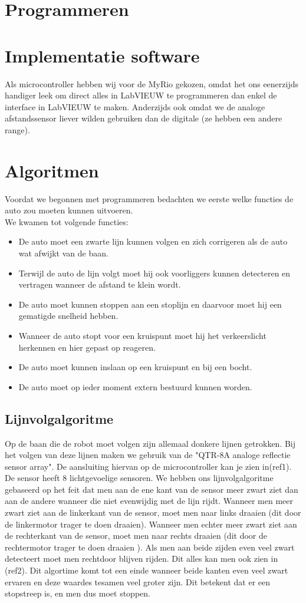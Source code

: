 \documentclass[12pt]{article}
\begin{document}
	

\section{Programmeren}
\section*{Implementatie software}
Als microcontroller hebben wij voor de MyRio gekozen, omdat het ons eenerzijds handiger leek om direct alles in LabVIEUW te programmeren dan enkel de interface in LabVIEUW te maken. Anderzijds ook omdat we de analoge afstandssensor liever wilden gebruiken dan de digitale (ze hebben een andere range).

\section*{Algoritmen}
Voordat we begonnen met programmeren bedachten we eerste welke functies de auto zou moeten kunnen uitvoeren.\\
We kwamen tot volgende functies:
	\begin{itemize}\item De auto moet een zwarte lijn kunnen volgen en zich corrigeren als de auto wat afwijkt van de baan.
	\item Terwijl de auto de lijn volgt moet hij ook voorliggers kunnen detecteren en vertragen wanneer de afstand te klein wordt.
	\item De auto moet kunnen stoppen aan een stoplijn en daarvoor moet hij een gematigde snelheid hebben.
	\item Wanneer de auto stopt voor een kruispunt moet hij het verkeerslicht herkennen en hier gepast op reageren.
	\item De auto moet kunnen inslaan op een kruispunt en bij een bocht.
	\item De auto moet op ieder moment extern bestuurd kunnen worden.\end{itemize}


\subsection{Lijnvolgalgoritme}
Op de baan die de robot moet volgen zijn allemaal donkere lijnen getrokken. Bij het volgen van deze lijnen maken we gebruik van de "QTR-8A analoge reflectie sensor array".
De aansluiting hiervan op de microcontroller kan je zien in(ref1). De sensor heeft 8 lichtgevoelige sensoren. We hebben ons lijnvolgalgoritme gebaseerd op het feit dat men aan de ene kant van de sensor meer zwart ziet dan aan de andere wanneer die niet evenwijdig met de lijn rijdt. Wanneer men meer zwart ziet aan de linkerkant van de sensor, moet men naar links draaien (dit door de linkermotor trager te doen draaien). Wanneer men echter meer zwart ziet aan de rechterkant van de sensor, moet men naar rechts draaien (dit door de rechtermotor trager te doen draaien ). Als men aan beide zijden even veel zwart detecteert moet men rechtdoor blijven rijden. Dit alles kan men ook zien in (ref2). Dit algortime komt tot een einde wanneer beide kanten even veel zwart ervaren en deze waardes tesamen veel groter zijn. Dit betekent dat er een stopstreep is, en men dus moet stoppen. 
\end{document}
